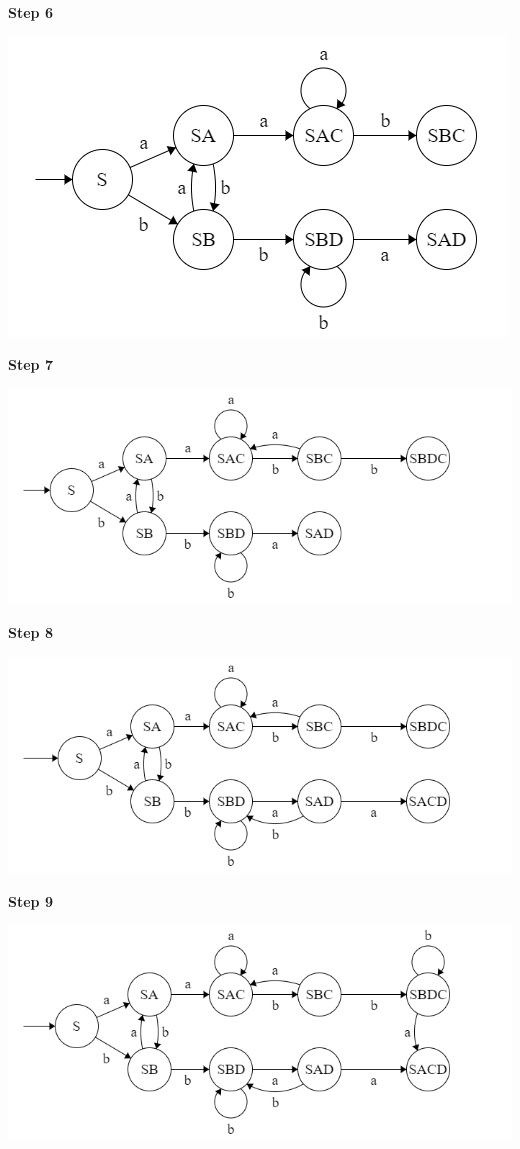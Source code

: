 \textbf{Step 6}

\includegraphics[width=0.7\linewidth]{02/dfa_step_06.png}

\textbf{Step 7}

\includegraphics[width=0.9\linewidth]{02/dfa_step_07.png}

\textbf{Step 8}

\includegraphics[width=0.9\linewidth]{02/dfa_step_08.png}

\textbf{Step 9}

\includegraphics[width=0.9\linewidth]{02/dfa_step_09.png}


